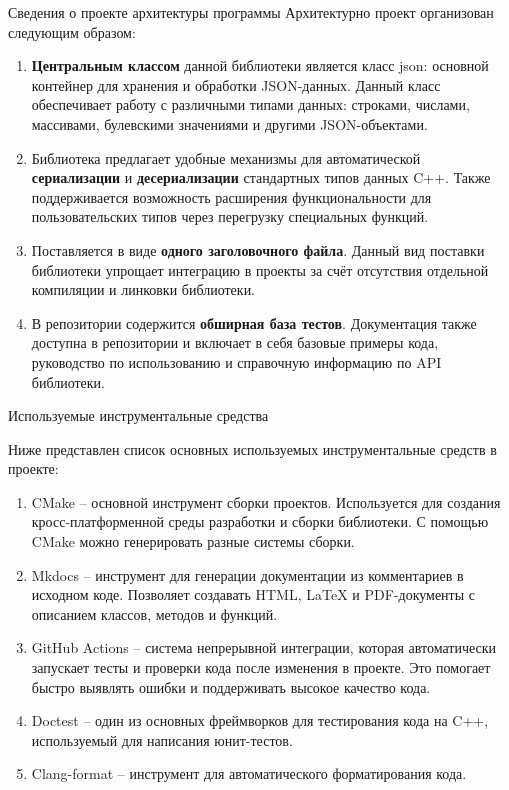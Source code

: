 \documentclass[10pt]{beamer}
\begin{document}
\begin{frame}{Сведения о проекте архитектуры программы}
    Архитектурно проект организован следующим образом:

    \begin{enumerate}
        \item \textbf{Центральным классом} данной библиотеки является класс json: основной контейнер для хранения и обработки JSON-данных. Данный класс обеспечивает работу с различными типами данных: строками, числами, массивами, булевскими значениями и другими JSON-объектами.

        \item Библиотека предлагает удобные механизмы для автоматической \textbf{сериализации} и \textbf{десериализации} стандартных типов данных C++.
            Также поддерживается возможность расширения функциональности для пользовательских типов через перегрузку специальных функций.
        \item Поставляется в виде \textbf{одного заголовочного файла}. Данный вид поставки библиотеки упрощает интеграцию в проекты за счёт отсутствия отдельной компиляции и линковки библиотеки.
        \item В репозитории содержится \textbf{обширная база тестов}. Документация также доступна в репозитории и включает в себя базовые примеры кода, руководство по использованию и справочную информацию по API библиотеки.
    \end{enumerate}
\end{frame}

\begin{frame}{Используемые инструментальные средства}

    Ниже представлен список основных используемых инструментальные средств в проекте:

    \begin{enumerate}
        \item CMake -- основной инструмент сборки проектов. Используется для создания кросс-платформенной среды разработки и сборки библиотеки. С помощью CMake можно генерировать разные системы сборки.
        \item Mkdocs -- инструмент для генерации документации из комментариев в исходном коде. Позволяет создавать HTML, LaTeX и PDF-документы с описанием классов, методов и функций.
        \item GitHub Actions -- система непрерывной интеграции, которая автоматически запускает тесты и проверки кода после изменения в проекте. Это помогает быстро выявлять ошибки и поддерживать высокое качество кода.
        \item Doctest -- один из основных фреймворков для тестирования кода на C++, используемый для написания юнит-тестов.
        \item Clang-format -- инструмент для автоматического форматирования кода.

    \end{enumerate}

\end{frame}
\end{document}
